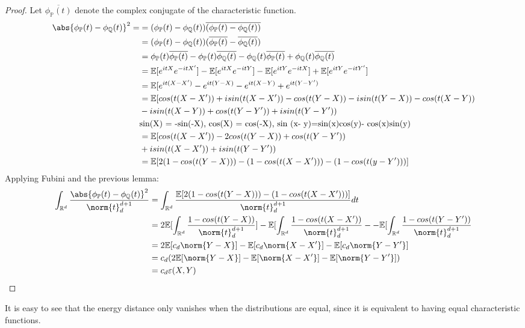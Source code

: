 \begin{proof}
\cite{DcovPropRara} Let $\overline{\phi_{\mathbb{P}}(t)}$ denote the complex conjugate of the characteristic function.\label{DcovDemRara}
\begin{equation}{}
\begin{split}
\abs{\phi_{\mathbb{P}}(t)-\phi_{\mathbb{Q}}(t)}^{2} = 
& = (\phi_{\mathbb{P}}(t)-\phi_{\mathbb{Q}}(t))\overline{(\phi_{\mathbb{P}}(t)-\phi_{\mathbb{Q}}(t))} \\
& = (\phi_{\mathbb{P}}(t)-\phi_{\mathbb{Q}}(t))(\overline{\phi_{\mathbb{P}}(t)}-\overline{\phi_{\mathbb{Q}}(t)})\\
&= \phi_{\mathbb{P}}(t)\overline{\phi_{\mathbb{P}}(t)} - \phi_{\mathbb{P}}(t)\overline{\phi_{\mathbb{Q}}(t)} - \phi_{\mathbb{Q}}(t)\overline{\phi_{\mathbb{P}}(t)} + 
\phi_{\mathbb{Q}}(t)\overline{\phi_{\mathbb{Q}}(t)} \\
&=\mathbb{E}[e^{itX}e^{-itX'}]-\mathbb{E}[e^{itX}e^{-itY}]
-\mathbb{E}[e^{itY}e^{-itX}] + \mathbb{E}[e^{itY}e^{-itY'}]\\
&=\mathbb{E}[e^{it(X-X')}-e^{it(Y-X)}-e^{it(X-Y)}+e^{it(Y-Y')} \\
&=\mathbb{E}[cos(t(X-X')) + isin(t(X-X'))-cos(t(Y-X))-isin(t(Y-X)) -cos(t(X-Y)) \\
&-isin(t(X-Y)) + cos(t(Y-Y'))+isin(t(Y-Y')) \\
&\text{sin(X) = -sin(-X), cos(X) = cos(-X), sin (x- y)=sin(x)cos(y)- cos(x)sin(y)}\\
&=\mathbb{E}[cos(t(X-X')) - 2cos(t(Y-X)) + cos(t(Y-Y')) \\
& + isin(t(X-X')) + isin(t(Y-Y'))\\
&= \mathbb{E}[2(1-cos(t(Y-X)))-(1-cos(t(X-X')))-(1-cos(t(y-Y')))]
\end{split}
\end{equation}
Applying Fubini and the previous lemma:
\begin{equation}{}
\begin{split}
\int_{\mathbb{R}^{d}}\frac{\abs{\phi_{\mathbb{P}}(t)-\phi_{\mathbb{Q}}(t)}^{2}}{\norm{t}^{d+1}_{d}}
&=\int_{\mathbb{R}^{d}}\frac{\mathbb{E}[2(1-cos(t(Y-X)))-(1-cos(t(X-X')))]}{\norm{t}^{d+1}_{d}} dt \\
&=2\mathbb{E}[\int_{\mathbb{R}^{d}}\frac{1-cos(t(Y-X))}{\norm{t}^{d+1}_{d}}] - \mathbb{E}[\int_{\mathbb{R}^{d}}\frac{1-cos(t(X-X'))}{\norm{t}^{d+1}_{d}} - - \mathbb{E}[\int_{\mathbb{R}^{d}}\frac{1-cos(t(Y-Y'))}{\norm{t}^{d+1}_{d}} \\
&=2\mathbb{E}[c_{d}\norm{Y-X}] - \mathbb{E}[c_{d}\norm{X-X'}] -\mathbb{E}[c_{d}\norm{Y-Y'}] \\
&= c_{d}(2\mathbb{E}[\norm{Y-X}] - \mathbb{E}[\norm{X-X'}] -\mathbb{E}[\norm{Y-Y'}])\\
&= c_{d}\varepsilon(X,Y)
\end{split}
\end{equation}
\end{proof}
It is easy to see that the energy distance only vanishes when the distributions are equal, since it is equivalent to having equal characteristic functions.
